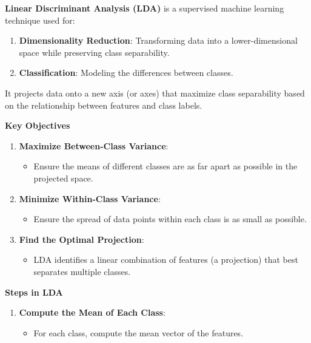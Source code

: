 \documentclass{article}
\providecommand{\tightlist}{%
      \setlength{\itemsep}{0pt}\setlength{\parskip}{0pt}}
\begin{document}
\textbf{Linear Discriminant Analysis (LDA)} is a supervised machine
learning technique used for:

\begin{enumerate}
\def\labelenumi{\arabic{enumi}.}
\item
  \textbf{Dimensionality Reduction}: Transforming data into a
  lower-dimensional space while preserving class separability.
\item
  \textbf{Classification}: Modeling the differences between classes.
\end{enumerate}

It projects data onto a new axis (or axes) that maximize class
separability based on the relationship between features and class
labels.

\textbf{Key Objectives}

\begin{enumerate}
\def\labelenumi{\arabic{enumi}.}
\tightlist
\item
  \textbf{Maximize Between-Class Variance}:

  \begin{itemize}
  \tightlist
  \item
    Ensure the means of different classes are as far apart as possible
    in the projected space.
  \end{itemize}
\item
  \textbf{Minimize Within-Class Variance}:

  \begin{itemize}
  \tightlist
  \item
    Ensure the spread of data points within each class is as small as
    possible.
  \end{itemize}
\item
  \textbf{Find the Optimal Projection}:

  \begin{itemize}
  \tightlist
  \item
    LDA identifies a linear combination of features (a projection) that
    best separates multiple classes.
  \end{itemize}
\end{enumerate}

\textbf{Steps in LDA}

\begin{enumerate}
\def\labelenumi{\arabic{enumi}.}
\tightlist
\item
  \textbf{Compute the Mean of Each Class}:

  \begin{itemize}
  \tightlist
  \item
    For each class, compute the mean vector of the features.
  \end{itemize}
\end{enumerate}
\end{document}
